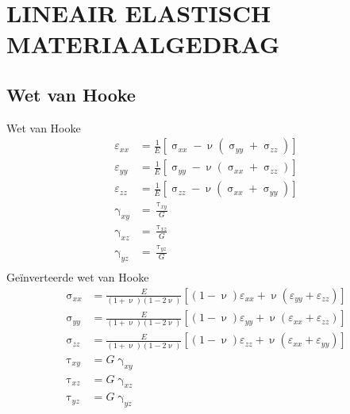     \section{LINEAIR ELASTISCH MATERIAALGEDRAG}

        \subsection{Wet van Hooke}
            
            Wet van Hooke
            \begin{align}
                \varepsilon_{xx} &= \frac{1}{E}\left[\upsigma_{xx} - \upnu\left(\upsigma_{yy}+\upsigma_{zz}\right)\right]\nonumber\\
                \varepsilon_{yy} &= \frac{1}{E}\left[\upsigma_{yy} - \upnu\left(\upsigma_{xx}+\upsigma_{zz}\right)\right]\nonumber\\
                \varepsilon_{zz} &= \frac{1}{E}\left[\upsigma_{zz} - \upnu\left(\upsigma_{xx}+\upsigma_{yy}\right)\right]\nonumber\\
                \upgamma_{xy} &= \frac{\uptau_{xy}}{G}\nonumber\\
                \upgamma_{xz} &= \frac{\uptau_{xz}}{G}\nonumber\\
                \upgamma_{yz} &= \frac{\uptau_{yz}}{G}\nonumber\\
            \end{align}
            Geïnverteerde wet van Hooke
            \begin{align}
                \upsigma_{xx} &= \frac{E}{(1+\upnu)(1-2\upnu)}\left[(1-\upnu)\varepsilon_{xx}+\upnu\left(\varepsilon_{yy}+\varepsilon_{zz}\right)\right]\nonumber\\
                \upsigma_{yy} &= \frac{E}{(1+\upnu)(1-2\upnu)}\left[(1-\upnu)\varepsilon_{yy}+\upnu\left(\varepsilon_{xx}+\varepsilon_{zz}\right)\right]\nonumber\\
                \upsigma_{zz} &= \frac{E}{(1+\upnu)(1-2\upnu)}\left[(1-\upnu)\varepsilon_{zz}+\upnu\left(\varepsilon_{xx}+\varepsilon_{yy}\right)\right]\nonumber\\
                \uptau_{xy} &= G\upgamma_{xy}\nonumber\\
                \uptau_{xz} &= G\upgamma_{xz}\nonumber\\
                \uptau_{yz} &= G\upgamma_{yz}\nonumber\\
                \label{Wet_van_Hooke_inv}
            \end{align}
        
